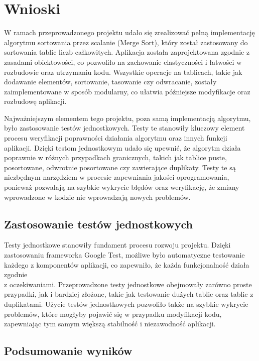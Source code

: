 \newpage
\section{Wnioski}

W ramach przeprowadzonego projektu udało się zrealizować pełną implementację algorytmu sortowania przez scalanie (Merge Sort),
który został zastosowany do sortowania tablic liczb całkowitych. Aplikacja została zaprojektowana zgodnie z zasadami obiektowości,
co pozwoliło na zachowanie elastyczności i łatwości w rozbudowie oraz utrzymaniu kodu. Wszystkie operacje na tablicach, takie jak dodawanie elementów,
sortowanie, tasowanie czy odwracanie, zostały zaimplementowane w sposób modularny, co ułatwia późniejsze modyfikacje oraz rozbudowę aplikacji.

Najważniejszym elementem tego projektu, poza samą implementacją algorytmu, było zastosowanie testów jednostkowych.
Testy te stanowiły kluczowy element procesu weryfikacji poprawności działania algorytmu oraz innych funkcji aplikacji.
Dzięki testom jednostkowym udało się upewnić, że algorytm działa poprawnie w różnych przypadkach granicznych,
takich jak tablice puste, posortowane, odwrotnie posortowane czy zawierające duplikaty.
Testy te są niezbędnym narzędziem w procesie zapewniania jakości oprogramowania, ponieważ pozwalają na szybkie wykrycie błędów oraz weryfikację,
że zmiany wprowadzone w kodzie nie wprowadzają nowych problemów.

\subsection{Zastosowanie testów jednostkowych}

Testy jednostkowe stanowiły fundament procesu rozwoju projektu.
Dzięki zastosowaniu frameworka Google Test, możliwe było automatyczne testowanie każdego z komponentów aplikacji, co zapewniło,
że każda funkcjonalność działa zgodnie \\ z oczekiwaniami.
Przeprowadzone testy jednostkowe obejmowały zarówno proste przypadki, jak i bardziej złożone, takie jak testowanie dużych tablic oraz tablic z duplikatami.
Użycie testów jednostkowych pozwoliło także na szybkie wykrycie problemów, które mogłyby pojawić się w przypadku modyfikacji kodu,
zapewniając tym samym większą stabilność i niezawodność aplikacji.

\newpage

\subsection{Podsumowanie wyników}

